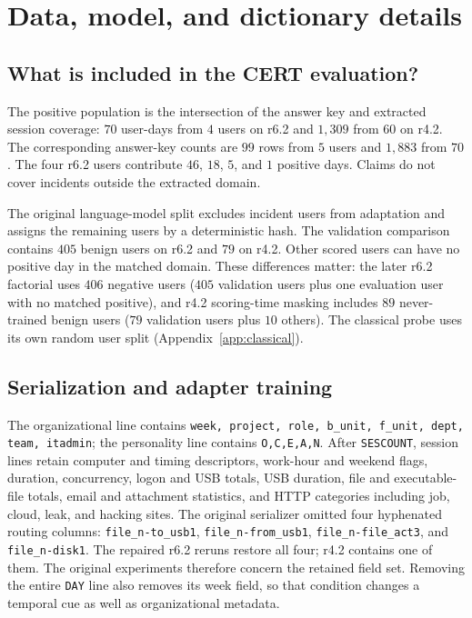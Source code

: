 \section{Data, model, and dictionary details}
\label{app:populations}

\subsection{What is included in the CERT evaluation?}

The positive population is the intersection of the answer key and extracted
session coverage: $70$ user-days from $4$ users on r6.2 and $1{,}309$
from $60$ on r4.2. The corresponding answer-key counts are $99$ rows
from $5$ users and $1{,}883$ from $70$. The four r6.2 users contribute
$46$, $18$, $5$, and $1$ positive days. Claims do not cover incidents
outside the extracted domain.

The original language-model split excludes incident users from adaptation
and assigns the remaining users by a deterministic hash. The validation
comparison contains $405$ benign users on r6.2 and $79$ on r4.2.
Other scored users can have no positive day in the matched domain. These
differences matter: the later r6.2 factorial uses $406$ negative users
($405$ validation users plus one evaluation user with no matched positive),
and r4.2 scoring-time masking includes $89$ never-trained benign users
($79$ validation users plus $10$ others). The classical probe uses its own
random user split (Appendix~\ref{app:classical}).

\subsection{Serialization and adapter training}

The organizational line contains \texttt{week, project, role, b\_unit,
f\_unit, dept, team, itadmin}; the personality line contains
\texttt{O,C,E,A,N}. After \texttt{SESCOUNT}, session lines retain computer
and timing descriptors, work-hour and weekend flags, duration, concurrency,
logon and USB totals, USB duration, file and executable-file totals,
email and attachment statistics, and HTTP categories including job,
cloud, leak, and hacking sites.
The original serializer omitted four hyphenated routing columns:
\texttt{file\_n-to\_usb1}, \texttt{file\_n-from\_usb1},
\texttt{file\_n-file\_act3}, and \texttt{file\_n-disk1}.
The repaired r6.2 reruns restore all four; r4.2 contains one of them.
The original experiments therefore concern the retained field set.
Removing the entire \texttt{DAY} line also removes its week field, so
that condition changes a temporal cue as well as organizational metadata.

